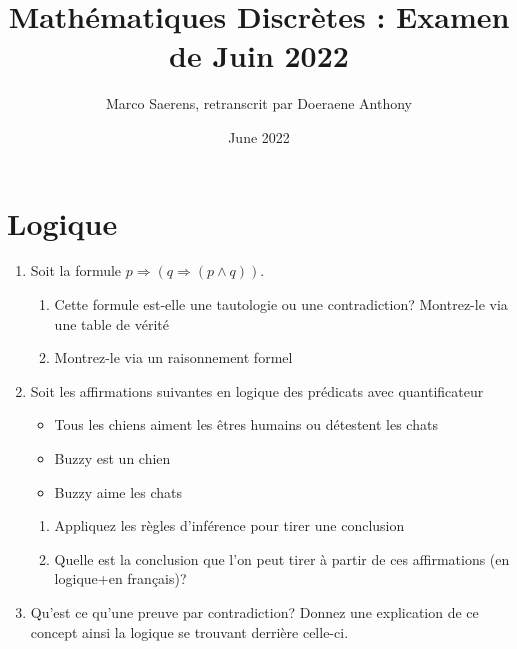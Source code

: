 \documentclass[A4paper,11pt]{article}
\title{Mathématiques Discrètes : Examen de Juin 2022}
\author{Marco Saerens, retranscrit par Doeraene Anthony}
\date{June 2022}
\begin{document}
\maketitle

\section{Logique}
\begin{enumerate}
    \item Soit la formule $p\Rightarrow (q\Rightarrow (p\land q))$. 
    \begin{enumerate}
        \item Cette formule est-elle une tautologie ou une contradiction? Montrez-le via une table de vérité
        \item Montrez-le via un raisonnement formel
    \end{enumerate}
    
    \item Soit les affirmations suivantes en logique des prédicats avec quantificateur
    \begin{itemize}
        \item Tous les chiens aiment les êtres humains ou détestent les chats
        \item Buzzy est un chien
        \item Buzzy aime les chats
    \end{itemize}
    \begin{enumerate}
        \item Appliquez les règles d'inférence pour tirer une conclusion
        \item Quelle est la conclusion que l'on peut tirer à partir de ces affirmations (en logique+en français)?
    \end{enumerate}
    \item Qu'est ce qu'une preuve par contradiction? Donnez une explication de ce concept ainsi la logique se trouvant derrière celle-ci.
\end{enumerate}
\end{document}
